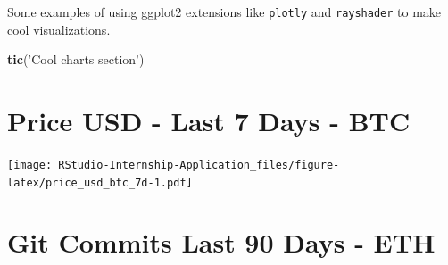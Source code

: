 \documentclass[
]{book}
\newenvironment{Shaded}{\begin{snugshade}}{\end{snugshade}}
\newcommand{\DataTypeTok}[1]{\textcolor[rgb]{0.13,0.29,0.53}{#1}}
\newcommand{\FloatTok}[1]{\textcolor[rgb]{0.00,0.00,0.81}{#1}}
\newcommand{\KeywordTok}[1]{\textcolor[rgb]{0.13,0.29,0.53}{\textbf{#1}}}
\newcommand{\NormalTok}[1]{#1}
\newcommand{\OperatorTok}[1]{\textcolor[rgb]{0.81,0.36,0.00}{\textbf{#1}}}
\newcommand{\StringTok}[1]{\textcolor[rgb]{0.31,0.60,0.02}{#1}}
\begin{document}
Some examples of using ggplot2 extensions like \texttt{plotly} \citep{R-plotly} and \texttt{rayshader} \citep{R-rayshader} to make cool visualizations.

\begin{Shaded}
\begin{Highlighting}[]
\KeywordTok{tic}\NormalTok{(}\StringTok{'Cool charts section'}\NormalTok{)}
\end{Highlighting}
\end{Shaded}

\hypertarget{price-usd---last-7-days---btc}{%
\section{Price USD - Last 7 Days - BTC}\label{price-usd---last-7-days---btc}}

\begin{Shaded}
\end{Shaded}

\texttt{[image: RStudio-Internship-Application\_files/figure-latex/price\_usd\_btc\_7d-1.pdf]}

\hypertarget{git-commits-last-90-days---eth}{%
\section{Git Commits Last 90 Days - ETH}\label{git-commits-last-90-days---eth}}
\end{document}
